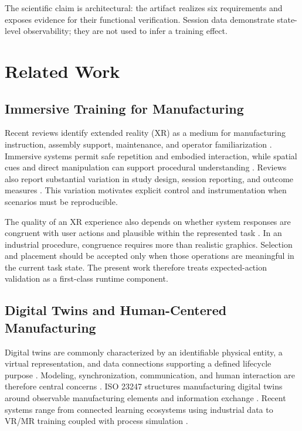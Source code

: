 \documentclass[conference]{IEEEtran}
\begin{document}
The scientific claim is architectural: the artifact realizes six requirements and exposes evidence for their functional verification. Session data demonstrate state-level observability; they are not used to infer a training effect.

\section{Related Work}

\subsection{Immersive Training for Manufacturing}

Recent reviews identify extended reality (XR) as a medium for manufacturing instruction, assembly support, maintenance, and operator familiarization \cite{Doolani2020,GarciaFracaro2022,WangXR2024}. Immersive systems permit safe repetition and embodied interaction, while spatial cues and direct manipulation can support procedural understanding \cite{Radianti2020,Hu2021}. Reviews also report substantial variation in study design, session reporting, and outcome measures \cite{Strojny2023}. This variation motivates explicit control and instrumentation when scenarios must be reproducible.

The quality of an XR experience also depends on whether system responses are congruent with user actions and plausible within the represented task \cite{Latoschik2021}. In an industrial procedure, congruence requires more than realistic graphics. Selection and placement should be accepted only when those operations are meaningful in the current task state. The present work therefore treats expected-action validation as a first-class runtime component.

\subsection{Digital Twins and Human-Centered Manufacturing}

Digital twins are commonly characterized by an identifiable physical entity, a virtual representation, and data connections supporting a defined lifecycle purpose \cite{Jones2020,Fuller2020}. Modeling, synchronization, communication, and human interaction are therefore central concerns \cite{Thelen2022,Wilhelm2021}. ISO 23247 structures manufacturing digital twins around observable manufacturing elements and information exchange \cite{ISO23247}. Recent systems range from connected learning ecosystems using industrial data \cite{GarciaDTLE2024} to VR/MR training coupled with process simulation \cite{Jalilvand2024}.
\end{document}

